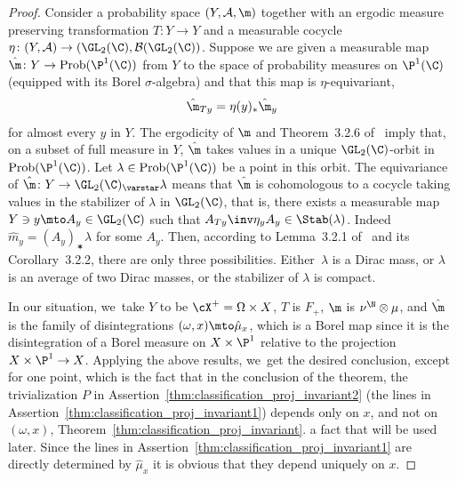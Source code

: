 \begin{proof}
Consider a probability space $(Y, \mathcal{A}, \m)$ together with an ergodic measure preserving transformation $T\colon Y\to Y$ and a measurable cocycle $\eta\colon (Y, \mathcal A)\to (\GL_2(\C), \mathcal{B}(\GL_2(\C))$. Suppose we are given a measurable map
$\hat\m\colon Y\to \mathrm{Prob}(\P^1(\C))$ from $Y$ to the space of probability measures on $\P^1(\C)$ (equipped with its Borel $\sigma$-algebra)
and that this map is $\eta$-equivariant, \ie
\begin{equation*}
\hat\m_{Ty}=\eta(y)_*\hat\m_y
\end{equation*}
for almost every $y$ in $Y$. The ergodicity of $\m$ and Theorem~3.2.6 of~\cite{Zimmer:book} imply
that, on a subset of full measure in $Y$, $\hat\m$ takes values in a unique $\GL_2(\C)$-orbit in $\mathrm{Prob}(\P^1(\C))$. Let $\lambda\in \mathrm{Prob}(\P^1(\C))$ be a point in this orbit. The equivariance of $\hat\m\colon Y\to \GL_2(\C)_\varstar\lambda$ means that $\hat\m$ is cohomologous to a cocycle taking values in the stabilizer of $\lambda$ in $\GL_2(\C)$, that is,
there exists a measurable map $Y\ni y\mto A_y\in \GL_2(\C)$ such that
$A_{Ty}\inv \eta_y A_y \in \Stab(\lambda)$. Indeed $\hat m_y = (A_y)_\varstar \lambda$ for some $A_y$.
Then, according to Lemma~3.2.1 of~\cite{Zimmer:book} and its Corollary~3.2.2, there are only three possibilities. Either~$\lambda$ is a Dirac mass, or $\lambda$ is an average of two Dirac masses, or the stabilizer of $\lambda$ is compact.

In our situation, we~take $Y$ to be $\cX^+ = \Omega\times X$, $T$ is $F_+$,
$\m$ is $\nu^\N \otimes \mu$, and $\hat \m$ is the family of disintegrations
$(\omega, x)\mto \hat \mu_x$, which is a Borel map since it is the disintegration of a Borel measure on $X\times \P^1$ relative to the projection $X\times \P^1\to X$. Applying the above results, we~get the desired conclusion, except for one point, which is the fact that in the conclusion of the theorem,
the trivialization $P$ in Assertion~\eqref{thm:classification_proj_invariant2} (\resp the lines in Assertion~\eqref{thm:classification_proj_invariant1}) depends only on $x$, and not on $(\omega,x)$, Theorem~\ref{thm:classification_proj_invariant}.
a fact that will be used later.
Since the lines in Assertion~\eqref{thm:classification_proj_invariant1} are directly determined by $\hat \mu_x$ it is obvious that they
depend uniquely on $x$.


\end{proof}
